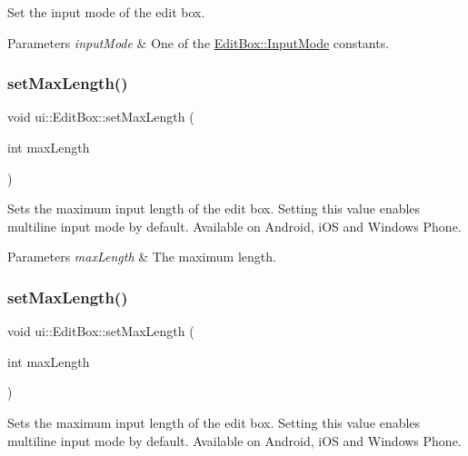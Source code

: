 Set the input mode of the edit box. 
\begin{DoxyParams}{Parameters}
{\em input\+Mode} & One of the \hyperlink{classui_1_1EditBox_a7a1bfe8f3ba218bedfcf5451ec3ce01a}{Edit\+Box\+::\+Input\+Mode} constants. \\
\hline
\end{DoxyParams}
\mbox{\label{classui_1_1EditBox_a7f9fd5527404e0dc6e98e23a661325b4}} 
\subsubsection{\texorpdfstring{set\+Max\+Length()}{setMaxLength()}\hspace{0.1cm}{\footnotesize\ttfamily [1/2]}}
{\footnotesize\ttfamily void ui\+::\+Edit\+Box\+::set\+Max\+Length (\begin{DoxyParamCaption}\item[{int}]{max\+Length }\end{DoxyParamCaption})}

Sets the maximum input length of the edit box. Setting this value enables multiline input mode by default. Available on Android, i\+OS and Windows Phone.


\begin{DoxyParams}{Parameters}
{\em max\+Length} & The maximum length. \\
\hline
\end{DoxyParams}
\mbox{\label{classui_1_1EditBox_a7f9fd5527404e0dc6e98e23a661325b4}} 
\subsubsection{\texorpdfstring{set\+Max\+Length()}{setMaxLength()}\hspace{0.1cm}{\footnotesize\ttfamily [2/2]}}
{\footnotesize\ttfamily void ui\+::\+Edit\+Box\+::set\+Max\+Length (\begin{DoxyParamCaption}\item[{int}]{max\+Length }\end{DoxyParamCaption})}

Sets the maximum input length of the edit box. Setting this value enables multiline input mode by default. Available on Android, i\+OS and Windows Phone.


